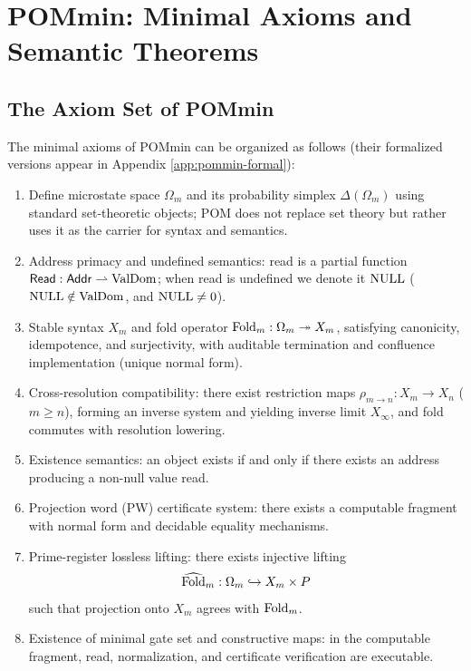 \section{POMmin: Minimal Axioms and Semantic Theorems}\label{sec:pommin}

\subsection{The Axiom Set of POMmin}
The minimal axioms of POMmin can be organized as follows (their formalized versions appear in Appendix \ref{app:pommin-formal}):
\begin{enumerate}[label=(A\arabic*), ref=A\arabic*]
  \item \label{ax:pommin-a1}
  Define microstate space $\Omega_m$ and its probability simplex $\Delta(\Omega_m)$ using standard set-theoretic objects; POM does not replace set theory but rather uses it as the carrier for syntax and semantics.\par

  \item \label{ax:pommin-a2}
  Address primacy and undefined semantics: read is a partial function $\mathsf{Read}:\mathsf{Addr}\rightharpoonup \mathrm{ValDom}$; when read is undefined we denote it $\mathrm{NULL}$ ($\mathrm{NULL}\notin\mathrm{ValDom}$, and $\mathrm{NULL}\neq 0$).\par

  \item \label{ax:pommin-a3}
  Stable syntax $X_m$ and fold operator $\mathrm{Fold}_m:\Omega_m\twoheadrightarrow X_m$, satisfying canonicity, idempotence, and surjectivity, with auditable termination and confluence implementation (unique normal form).\par

  \item \label{ax:pommin-a4}
  Cross-resolution compatibility: there exist restriction maps $\rho_{m\to n}:X_m\to X_n$ ($m\ge n$), forming an inverse system and yielding inverse limit $X_\infty$, and fold commutes with resolution lowering.\par

  \item \label{ax:pommin-a5}
  Existence semantics: an object exists if and only if there exists an address producing a non-null value read.\par

  \item \label{ax:pommin-a6}
  Projection word (PW) certificate system: there exists a computable fragment with normal form and decidable equality mechanisms.\par

  \item \label{ax:pommin-a7}
  Prime-register lossless lifting: there exists injective lifting
  $$
  \widehat{\mathrm{Fold}}_m:\Omega_m\hookrightarrow X_m\times P
  $$
  such that projection onto $X_m$ agrees with $\mathrm{Fold}_m$.\par

  \item \label{ax:pommin-a8}
  Existence of minimal gate set and constructive maps: in the computable fragment, read, normalization, and certificate verification are executable.\par
\end{enumerate}
